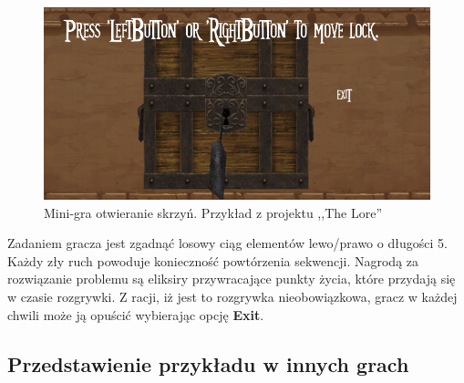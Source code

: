 \documentclass[oneside,polski,logo]{amuthesis}
\begin{document}
\begin{figure}[h]
	\centering
	\includegraphics[width=12cm]{images/tyrek/minigraskrzynia.png}
	\caption{Mini-gra otwieranie skrzyń. Przykład z projektu ,,The Lore''}
\end{figure}

Zadaniem gracza jest zgadnąć losowy ciąg elementów lewo/prawo o długości 5. Każdy zły ruch powoduje konieczność powtórzenia sekwencji. Nagrodą za rozwiązanie problemu są eliksiry przywracające punkty życia, które przydają się w czasie rozgrywki. Z racji, iż jest to rozgrywka nieobowiązkowa, gracz w każdej chwili może ją opuścić wybierając opcję \textbf{Exit}.
\subsection{Przedstawienie przykładu w innych grach}
\end{document}
